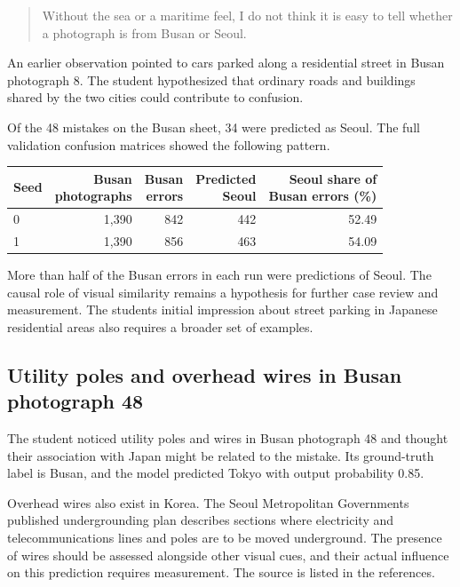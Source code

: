 \documentclass[11pt]{article}
\begin{document}
\begin{quote}\small
Without the sea or a maritime feel, I do not think it is easy to tell whether
a photograph is from Busan or Seoul.
\end{quote}

An earlier observation pointed to cars parked along a residential street in
Busan photograph 8. The student hypothesized that ordinary roads and buildings
shared by the two cities could contribute to confusion.

Of the 48 mistakes on the Busan sheet, 34 were predicted as Seoul. The full
validation confusion matrices showed the following pattern.

\begin{center}\small
\begin{tabular}{lrrrr}
\toprule
Seed & \shortstack{Busan\\photographs} & \shortstack{Busan\\errors} &
\shortstack{Predicted\\Seoul} & \shortstack{Seoul share of\\Busan errors (\%)} \\
\midrule
0 & 1,390 & 842 & 442 & 52.49 \\
1 & 1,390 & 856 & 463 & 54.09 \\
\bottomrule
\end{tabular}
\end{center}

More than half of the Busan errors in each run were predictions of Seoul.
The causal role of visual similarity remains a hypothesis for further case
review and measurement. The student\textquotesingle{}s initial impression about street parking
in Japanese residential areas also requires a broader set of examples.

\subsection{Utility poles and overhead wires in Busan photograph 48}

The student noticed utility poles and wires in Busan photograph 48 and thought
their association with Japan might be related to the mistake. Its ground-truth
label is Busan, and the model predicted Tokyo with output probability 0.85.

Overhead wires also exist in Korea. The Seoul Metropolitan Government\textquotesingle{}s
published undergrounding plan describes sections where electricity and
telecommunications lines and poles are to be moved underground. The presence
of wires should be assessed alongside other visual cues, and their actual
influence on this prediction requires measurement. The source is listed in
the references.
\end{document}
